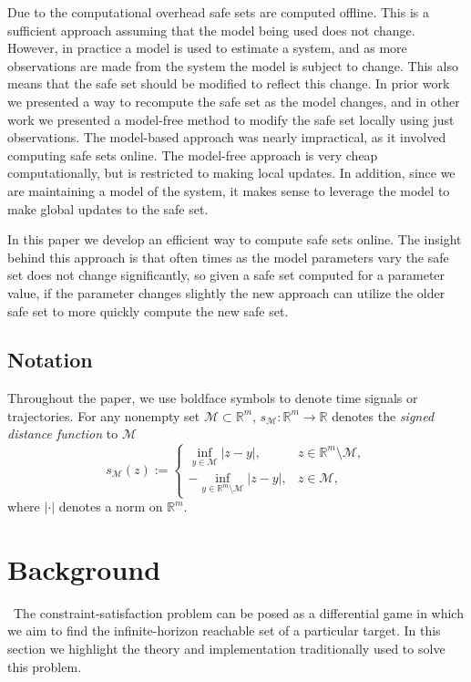 \documentclass{journal}
\newcommand{\M}{\mathcal{M}}
\newcommand{\RR}{\mathbb{R}}
\begin{document}
Due to the computational overhead safe sets are computed offline. This is a sufficient approach assuming that the model being used does not change. However, in practice a model is used to estimate a system, and as more observations are made from the system the model is subject to change. This also means that the safe set should be modified to reflect this change. In prior work we presented a way to recompute the safe set as the model changes, and in other work we presented a model-free method to modify the safe set locally using just observations. The model-based approach was nearly impractical, as it involved computing safe sets online. The model-free approach is very cheap computationally, but is restricted to making local updates. In addition, since we are maintaining a model of the system, it makes sense to leverage the model to make global updates to the safe set.  

In this paper we develop an efficient way to compute safe sets online. The insight behind this approach is that often times as the model parameters vary the safe set does not change significantly, so given a safe set computed for a parameter value, if the parameter changes slightly the new approach can utilize the older safe set to more quickly compute the new safe set. 

\subsection*{Notation}

Throughout the paper, we use boldface symbols to denote time signals or trajectories.
For any nonempty set $\M\subset\RR^m$, $s_{\M}:\RR^m\to\RR$ denotes the \emph{signed distance function} to $\M$
\[s_\M(z) := \begin{cases}\inf_{y\in\M} |z-y|,&z\in\RR^m\setminus\M, \\ -\inf_{y\in\RR^m\setminus\M} |z-y|,&z\in\M,\end{cases}\]
where $|\cdot|$ denotes a norm on $\RR^m$.

\section{Background \label{sec:back}} \
The constraint-satisfaction problem can be posed as a differential game in which we aim to find the infinite-horizon reachable set of a particular target. In this section we highlight the theory and implementation traditionally used to solve this problem.

\end{document}
